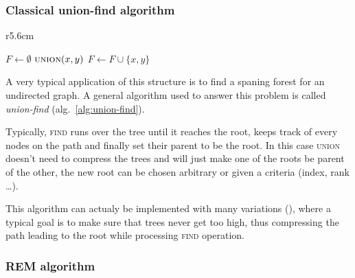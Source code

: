 \documentclass[12px]{article}
\begin{document}
      \subsubsection{Classical union-find algorithm}
        \setlength\intextsep{0pt}
        \begin{wrapfigure}{r}{5.6cm}
          \centering
          \begin{minipage}{\linewidth}
            \begin{algorithm}[H]
              \caption{General structure of Union-Find}%
              \label{alg:union-find}
              \begin{algorithmic}[1]
                \State $F \gets \emptyset$
                  \State {}
                \EndFor
                    \State $\Call{union}{x, y}$
                    \State $F \gets F \cup \{x, y\}$
                  \EndIf
                \EndFor
              \end{algorithmic}
            \end{algorithm}
          \end{minipage}
        \end{wrapfigure}

        A very typical application of this structure is to find a spaning forest for an undirected graph. A general algorithm used to answer this problem is called \emph{union-find} (alg.~\ref{alg:union-find}).

        Typically, \textsc{find} runs over the tree until it reaches the root, keeps track of every nodes on the path and finally set their parent to be the root. In this case \textsc{union} doesn't need to compress the trees and will just make one of the roots be parent of the other, the new root can be chosen arbitrary or given a criteria (index, rank \dots).

        This algorithm can actualy be implemented with many variations (), where a typical goal is to make sure that trees never get too high, thus compressing the path leading to the root while processing \textsc{find} operation.


      \subsubsection{REM algorithm}
\end{document}
